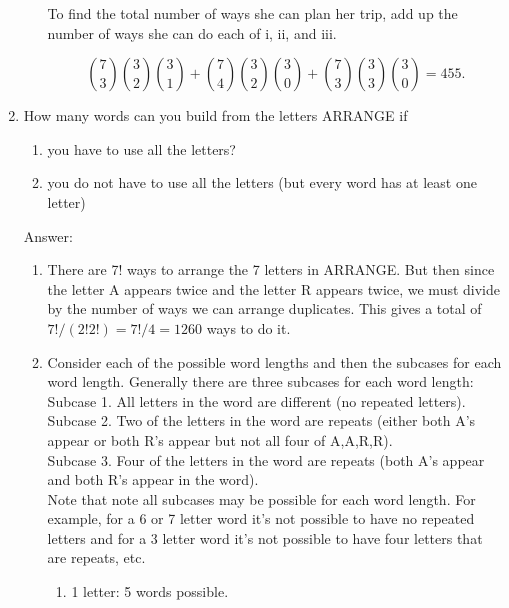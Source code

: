 \documentclass{article}
\begin{document}
\begin{enumerate}
\begin{enumerate}
To find the total number of ways she can plan her trip, add up the number of ways she can do each of i, ii, and iii. 

$$
\binom{7}{3} \binom{3}{2} \binom{3}{1}
+ \binom{7}{4} \binom{3}{2} \binom{3}{0}
+ \binom{7}{3} \binom{3}{3} \binom{3}{0}
= 455.
$$
\end{enumerate}


\item
How many words can you build from the letters ARRANGE if

\begin{enumerate}
\item you have to use all the letters?
\item you do not have to use all the letters (but every word has at least one letter)
\end{enumerate}

Answer:

\begin{enumerate}
\item There are 7! ways to arrange the 7 letters in ARRANGE. But then since the letter A appears twice and the letter R appears twice, we must divide by the number of ways we can arrange duplicates. This gives a total of $7!/(2!2!) = 7!/4 = 1260$ ways to do it. 
\item Consider each of the possible word lengths and then the subcases for each word length. Generally there are three subcases for each word length: \\

Subcase 1. All letters in the word are different (no repeated letters). \\

Subcase 2. Two of the letters in the word are repeats (either both A's appear or both R's appear but not all four of A,A,R,R).\\

Subcase 3. Four of the letters in the word are repeats (both A's appear and both R's appear in the word). \\

Note that note all subcases may be possible for each word length. For example, for a 6 or 7 letter word it's not possible to have no repeated letters and for a 3 letter word it's not possible to have four letters that are repeats, etc.

\begin{enumerate}
\item 1 letter: 5 words possible.


\end{enumerate}
\end{enumerate}
\end{enumerate}
\end{document}
